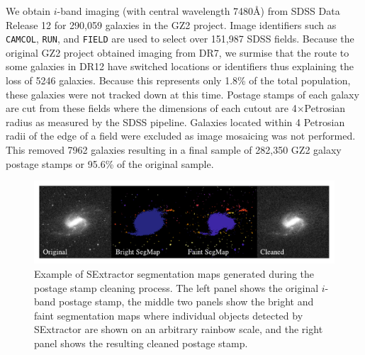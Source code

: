 We obtain $i$-band imaging (with central wavelength 7480\AA) from SDSS Data Release 12 for 290,059 galaxies in the GZ2 project. Image identifiers such as \texttt{CAMCOL}, \texttt{RUN}, and \texttt{FIELD} are used to select over 151,987 SDSS fields. Because the original GZ2 project obtained imaging from DR7, we surmise that the route to some galaxies in DR12 have switched locations or identifiers thus explaining the loss of 5246 galaxies. Because this represents only 1.8\% of the total population, these galaxies were not tracked down at this time. Postage stamps of each galaxy are cut from these fields where the dimensions of each cutout are 4$\times$Petrosian radius as measured by the SDSS pipeline. Galaxies located within 4 Petrosian radii of the edge of a field were excluded as image mosaicing was not performed. This removed 7962 galaxies resulting in a final sample of 282,350 GZ2 galaxy postage stamps or 95.6\% of the original sample.

\begin{figure}
\includegraphics[width=\textwidth]{Figures/sextractor_example.pdf}
\caption[Example of Source Extractor segmentation maps.]{Example of SExtractor segmentation maps generated during the postage stamp cleaning process. The left panel shows the original $i$-band postage stamp, the middle two panels show the bright and faint segmentation maps where individual objects detected by SExtractor are shown on an arbitrary rainbow scale, and the right panel shows the resulting cleaned postage stamp.}
\label{fig: segmaps}
\end{figure}


